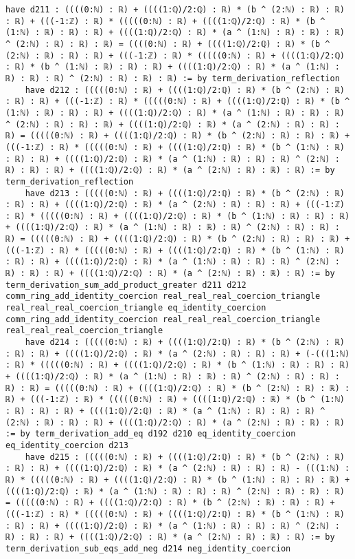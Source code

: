 \documentclass{article}
\begin{document}
\begin{tcolorbox}[colback=white!10, width=\linewidth]
\begin{lstlisting}[language=Lean4]
    have d211 : ((((0:ℕ) : ℝ) + ((((1:ℚ)/2:ℚ) : ℝ) * (b ^ (2:ℕ) : ℝ) : ℝ) : ℝ) + (((-1:ℤ) : ℝ) * (((((0:ℕ) : ℝ) + ((((1:ℚ)/2:ℚ) : ℝ) * (b ^ (1:ℕ) : ℝ) : ℝ) : ℝ) + ((((1:ℚ)/2:ℚ) : ℝ) * (a ^ (1:ℕ) : ℝ) : ℝ) : ℝ) ^ (2:ℕ) : ℝ) : ℝ) : ℝ) = ((((0:ℕ) : ℝ) + ((((1:ℚ)/2:ℚ) : ℝ) * (b ^ (2:ℕ) : ℝ) : ℝ) : ℝ) + (((-1:ℤ) : ℝ) * (((((0:ℕ) : ℝ) + ((((1:ℚ)/2:ℚ) : ℝ) * (b ^ (1:ℕ) : ℝ) : ℝ) : ℝ) + ((((1:ℚ)/2:ℚ) : ℝ) * (a ^ (1:ℕ) : ℝ) : ℝ) : ℝ) ^ (2:ℕ) : ℝ) : ℝ) : ℝ) := by term_derivation_reflection
    have d212 : (((((0:ℕ) : ℝ) + ((((1:ℚ)/2:ℚ) : ℝ) * (b ^ (2:ℕ) : ℝ) : ℝ) : ℝ) + (((-1:ℤ) : ℝ) * (((((0:ℕ) : ℝ) + ((((1:ℚ)/2:ℚ) : ℝ) * (b ^ (1:ℕ) : ℝ) : ℝ) : ℝ) + ((((1:ℚ)/2:ℚ) : ℝ) * (a ^ (1:ℕ) : ℝ) : ℝ) : ℝ) ^ (2:ℕ) : ℝ) : ℝ) : ℝ) + ((((1:ℚ)/2:ℚ) : ℝ) * (a ^ (2:ℕ) : ℝ) : ℝ) : ℝ) = (((((0:ℕ) : ℝ) + ((((1:ℚ)/2:ℚ) : ℝ) * (b ^ (2:ℕ) : ℝ) : ℝ) : ℝ) + (((-1:ℤ) : ℝ) * (((((0:ℕ) : ℝ) + ((((1:ℚ)/2:ℚ) : ℝ) * (b ^ (1:ℕ) : ℝ) : ℝ) : ℝ) + ((((1:ℚ)/2:ℚ) : ℝ) * (a ^ (1:ℕ) : ℝ) : ℝ) : ℝ) ^ (2:ℕ) : ℝ) : ℝ) : ℝ) + ((((1:ℚ)/2:ℚ) : ℝ) * (a ^ (2:ℕ) : ℝ) : ℝ) : ℝ) := by term_derivation_reflection
    have d213 : (((((0:ℕ) : ℝ) + ((((1:ℚ)/2:ℚ) : ℝ) * (b ^ (2:ℕ) : ℝ) : ℝ) : ℝ) + ((((1:ℚ)/2:ℚ) : ℝ) * (a ^ (2:ℕ) : ℝ) : ℝ) : ℝ) + (((-1:ℤ) : ℝ) * (((((0:ℕ) : ℝ) + ((((1:ℚ)/2:ℚ) : ℝ) * (b ^ (1:ℕ) : ℝ) : ℝ) : ℝ) + ((((1:ℚ)/2:ℚ) : ℝ) * (a ^ (1:ℕ) : ℝ) : ℝ) : ℝ) ^ (2:ℕ) : ℝ) : ℝ) : ℝ) = (((((0:ℕ) : ℝ) + ((((1:ℚ)/2:ℚ) : ℝ) * (b ^ (2:ℕ) : ℝ) : ℝ) : ℝ) + (((-1:ℤ) : ℝ) * (((((0:ℕ) : ℝ) + ((((1:ℚ)/2:ℚ) : ℝ) * (b ^ (1:ℕ) : ℝ) : ℝ) : ℝ) + ((((1:ℚ)/2:ℚ) : ℝ) * (a ^ (1:ℕ) : ℝ) : ℝ) : ℝ) ^ (2:ℕ) : ℝ) : ℝ) : ℝ) + ((((1:ℚ)/2:ℚ) : ℝ) * (a ^ (2:ℕ) : ℝ) : ℝ) : ℝ) := by term_derivation_sum_add_product_greater d211 d212 comm_ring_add_identity_coercion real_real_real_coercion_triangle real_real_real_coercion_triangle eq_identity_coercion comm_ring_add_identity_coercion real_real_real_coercion_triangle real_real_real_coercion_triangle
    have d214 : (((((0:ℕ) : ℝ) + ((((1:ℚ)/2:ℚ) : ℝ) * (b ^ (2:ℕ) : ℝ) : ℝ) : ℝ) + ((((1:ℚ)/2:ℚ) : ℝ) * (a ^ (2:ℕ) : ℝ) : ℝ) : ℝ) + (-(((1:ℕ) : ℝ) * (((((0:ℕ) : ℝ) + ((((1:ℚ)/2:ℚ) : ℝ) * (b ^ (1:ℕ) : ℝ) : ℝ) : ℝ) + ((((1:ℚ)/2:ℚ) : ℝ) * (a ^ (1:ℕ) : ℝ) : ℝ) : ℝ) ^ (2:ℕ) : ℝ) : ℝ) : ℝ) : ℝ) = (((((0:ℕ) : ℝ) + ((((1:ℚ)/2:ℚ) : ℝ) * (b ^ (2:ℕ) : ℝ) : ℝ) : ℝ) + (((-1:ℤ) : ℝ) * (((((0:ℕ) : ℝ) + ((((1:ℚ)/2:ℚ) : ℝ) * (b ^ (1:ℕ) : ℝ) : ℝ) : ℝ) + ((((1:ℚ)/2:ℚ) : ℝ) * (a ^ (1:ℕ) : ℝ) : ℝ) : ℝ) ^ (2:ℕ) : ℝ) : ℝ) : ℝ) + ((((1:ℚ)/2:ℚ) : ℝ) * (a ^ (2:ℕ) : ℝ) : ℝ) : ℝ) := by term_derivation_add_eq d192 d210 eq_identity_coercion eq_identity_coercion d213
    have d215 : (((((0:ℕ) : ℝ) + ((((1:ℚ)/2:ℚ) : ℝ) * (b ^ (2:ℕ) : ℝ) : ℝ) : ℝ) + ((((1:ℚ)/2:ℚ) : ℝ) * (a ^ (2:ℕ) : ℝ) : ℝ) : ℝ) - (((1:ℕ) : ℝ) * (((((0:ℕ) : ℝ) + ((((1:ℚ)/2:ℚ) : ℝ) * (b ^ (1:ℕ) : ℝ) : ℝ) : ℝ) + ((((1:ℚ)/2:ℚ) : ℝ) * (a ^ (1:ℕ) : ℝ) : ℝ) : ℝ) ^ (2:ℕ) : ℝ) : ℝ) : ℝ) = (((((0:ℕ) : ℝ) + ((((1:ℚ)/2:ℚ) : ℝ) * (b ^ (2:ℕ) : ℝ) : ℝ) : ℝ) + (((-1:ℤ) : ℝ) * (((((0:ℕ) : ℝ) + ((((1:ℚ)/2:ℚ) : ℝ) * (b ^ (1:ℕ) : ℝ) : ℝ) : ℝ) + ((((1:ℚ)/2:ℚ) : ℝ) * (a ^ (1:ℕ) : ℝ) : ℝ) : ℝ) ^ (2:ℕ) : ℝ) : ℝ) : ℝ) + ((((1:ℚ)/2:ℚ) : ℝ) * (a ^ (2:ℕ) : ℝ) : ℝ) : ℝ) := by term_derivation_sub_eqs_add_neg d214 neg_identity_coercion

\end{lstlisting}
\end{tcolorbox}
\end{document}
